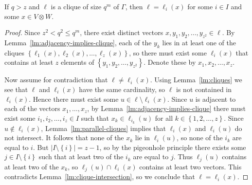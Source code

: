 \documentclass[ALCO, Unicode]{cedram}
\begin{document}
\begin{lemma} \label{lm:no-other-cliques}
If $q > z$ and $\ell$ is a clique of size $q^m$ of $\Gamma$, then $\ell = \ell_i{\left(x \right)}$ for some $i \in I$ and some $x \in V \otimes W$.
\end{lemma}
\begin{proof}
Since $z^2 < q^2 \leqslant q^m$, there exist distinct vectors $x, y_1, y_2, \ldots, y_{z^2} \in \ell$. By Lemma~\ref{lm:adjacency-implies-clique}, each of the $y_k$ lies in at least one of the cliques $\left\{\ell_1{\left(x \right)}, \ell_2{\left(x \right)}, \ldots, \ell_z{\left(x \right)}\right\}$, so there must exist some $\ell_i{\left(x \right)}$ that contains at least $z$ elements of $\left\{y_1, y_2, \ldots, y_{z^2} \right\}$. Denote these by $x_1, x_2, \ldots, x_z$.

Now assume for contradiction that $\ell \neq \ell_i{\left(x \right)}$. Using Lemma~\ref{lm:cliques} we see that $\ell$ and $\ell_i{\left(x \right)}$ have the same cardinality, so $\ell$ is not contained in $\ell_i{\left(x \right)}$. Hence there must exist some $u \in \ell \setminus \ell_i{\left(x \right)}$. Since $u$ is adjacent to each of the vectors $x_1, \ldots, x_z$, by Lemma~\ref{lm:adjacency-implies-clique} there must exist some $i_1, i_2, \ldots, i_z \in I$ such that $x_k \in \ell_{i_k}{\left(u \right)}$ for all $k \in \left\{1, 2, \ldots, z \right\}$. Since $u \notin \ell_i{\left(x \right)}$, Lemma~\ref{lm:parallel-cliques} implies that $\ell_i{\left(x \right)}$ and $\ell_i{\left(u \right)}$ do not intersect. It follows that none of the $x_k$ lie in $\ell_i{\left(u \right)}$, so none of the $i_k$ are equal to $i$. But $\left|I \setminus \left\{i \right\}\right| = z-1$, so by the pigeonhole principle there exists some $j \in I \setminus \left\{i \right\}$ such that at least two of the $i_k$ are equal to $j$. Thus $\ell_j{\left(u \right)}$ contains at least two of the $x_k$, so $\ell_j{\left(u \right)} \cap \ell_i{\left(x \right)}$ contains at least two vectors. This contradicts Lemma~\ref{lm:clique-intersection}, so we conclude that $\ell = \ell_i{\left(x \right)}$.
\end{proof}
\end{document}
